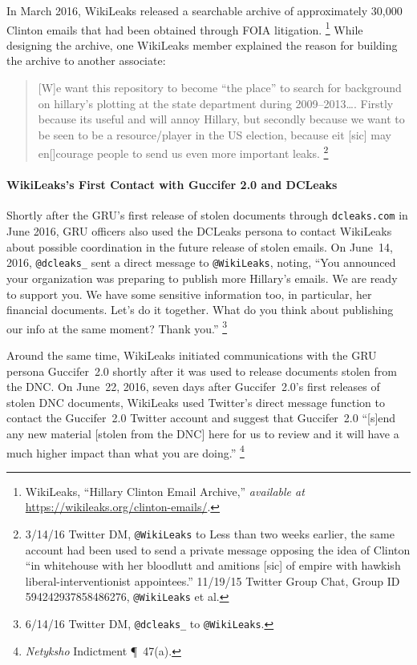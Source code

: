 In March 2016, WikiLeaks released a searchable archive of approximately 30,000 Clinton emails that had been obtained through FOIA litigation.%
\footnote{WikiLeaks, ``Hillary Clinton Email Archive,'' \textit{available at} \url{https://wikileaks.org/clinton-emails/}.}
While designing the archive, one WikiLeaks member explained the reason for building the archive to another associate:

\begin{quote}
[W]e want this repository to become ``the place'' to search for background on hillary's plotting at the state department during 2009--2013\dots.
Firstly because its useful and will annoy Hillary, but secondly because we want to be seen to be a resource/player in the US election, because eit [sic] may en[]courage people to send us even more important leaks.%
\footnote{3/14/16 Twitter DM, \verb+@WikiLeaks+ to 
Less than two weeks earlier, the same account had been used to send a private message opposing the idea of Clinton ``in whitehouse with her bloodlutt and amitions [sic] of empire with hawkish liberal-interventionist appointees.'' 11/19/15 Twitter Group Chat, Group ID 594242937858486276, \verb+@WikiLeaks+ et al.}
\end{quote}

\paragraph{WikiLeaks's First Contact with Guccifer 2.0 and DCLeaks}

Shortly after the GRU's first release of stolen documents through \verb+dcleaks.com+ in June 2016, GRU officers also used the DCLeaks persona to contact WikiLeaks about possible coordination in the future release of stolen emails.
On June~14, 2016, \verb+@dcleaks_+ sent a direct message to \verb+@WikiLeaks+, noting, ``You announced your organization was preparing to publish more Hillary's emails.
We are ready to support you.
We have some sensitive information too, in particular, her financial documents.
Let's do it together.
What do you think about publishing our info at the same moment?
Thank you.''%
\footnote{6/14/16 Twitter DM, \verb+@dcleaks_+ to \verb+@WikiLeaks+.}

Around the same time, WikiLeaks initiated communications with the GRU persona Guccifer~2.0 shortly after it was used to release documents stolen from the DNC\null.
On June~22, 2016, seven days after Guccifer~2.0's first releases of stolen DNC documents, WikiLeaks used Twitter's direct message function to contact the Guccifer~2.0 Twitter account and suggest that Guccifer~2.0 ``[s]end any new material [stolen from the DNC] here for us to review and it will have a much higher impact than what you are doing.''%
\footnote{\textit{Netyksho} Indictment \P~47(a).}

